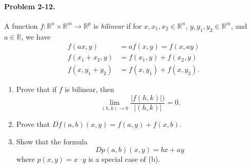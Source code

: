 \documentclass[11pt]{report}
\newcommand{\R}{\mathbb{R}}
\newcommand{\problem}[1]{\paragraph{Problem #1.}}
\begin{document}
    \problem{2-12} A function $f\colon \R^n \times \R^m \to \R^p$ is \emph{bilinear}
    if for $x, x_1, x_2 \in \R^n$, $y, y_1, y_2 \in \R^m$, and $a \in \R$, we have
    \begin{align*}
        f(ax, y) &= af(x, y) = f(x, ay) \\
        f(x_1 + x_2, y) &= f(x_1, y) + f(x_2, y) \\
        f(x, y_1 + y_2) &= f(x, y_1) + f(x, y_2).
    \end{align*}
    \begin{enumerate}
        \item Prove that if $f$ is bilinear, then \[
            \lim_{(h, k) \to 0} \frac{|f(h, k)|)}{|(h, k)|} = 0.
        \] 

        \item Prove that $Df(a, b)(x, y) = f(a, y) + f(x, b)$.
        \item Show that the formula \[
            Dp(a, b)(x, y) = bx + ay
        \] where $p(x, y) = x\cdot y$ is a special case of (b).
    \end{enumerate}
\end{document}
